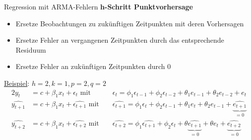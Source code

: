 \documentclass[10pt]{beamer}
\begin{document}
\begin{frame}{Regression mit ARMA-Fehlern}
	\textbf{h-Schritt Punktvorhersage}\\
	\begin{itemize}
		\item Ersetze Beobachtungen zu zukünftigen Zeitpunkten mit deren Vorhersagen
		\item Ersetze Fehler an vergangenen Zeitpunkten durch das entsprechende Residuum
		\item Ersetze Fehler an zukünftigen Zeitpunkten durch 0
	\end{itemize}
	\underline{Beispiel}: $h=2, k=1, p=2, q=2$
	\begin{alignat*}{2}
		y_t &= c + \beta_1 x_{t} + \epsilon_t \text{ mit }&&\epsilon_{t} = \phi_1\epsilon_{t-1} + \phi_2\epsilon_{t-2} + \theta_1e_{t-1} + \theta_2e_{t-2} + e_t \\		
		\widehat{y_{t+1}} &= c + \beta_1 x_{t} + \widehat{\epsilon_{t+1}} \text{ mit }&& \widehat{\epsilon_{t+1}} = \phi_1\epsilon_{t} + \phi_2\epsilon_{t-1} + \theta_1e_{t} + \theta_2e_{t-1} + \underbrace{\widehat{e_{t+1}}}_{=0}\\
		\widehat{y_{t+2}} &= c + \beta_1 x_{t} + \widehat{\epsilon_{t+2}}\text{ mit }&&\widehat{\epsilon_{t+2}} = \phi_1\widehat{\epsilon_{t+1}} + \phi_2\epsilon_t + \theta \underbrace{\widehat{e_{t+1}}}_{=0} + \theta e_t + \underbrace{\widehat{e_{t+2}}}_{=0}
	\end{alignat*}
\end{frame}


\end{document}

